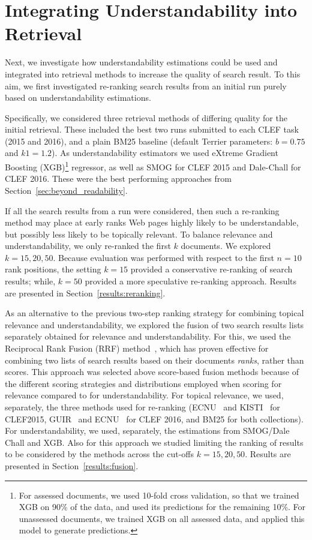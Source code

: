 \section{Integrating Understandability into Retrieval}
\label{sec:experiments}

Next, we investigate how understandability estimations could be used and integrated into retrieval methods to increase the quality of search result. To this aim, we first investigated re-ranking search results from an initial run purely based on understandability estimations. 

Specifically, we considered three retrieval methods of differing quality for the initial retrieval. These included the best two runs submitted to each CLEF task (2015 and 2016), and a plain BM25 baseline (default Terrier parameters: $b=0.75$ and $k1=1.2$). As understandability estimators we used  eXtreme Gradient Boosting (XGB)\footnote{For assessed documents, we used 10-fold cross validation, so that we trained XGB on 90\% of the data, and used its predictions for the remaining 10\%. For unassessed documents, we trained XGB on all assessed data, and applied this model to generate predictions.} regressor, as well as SMOG for CLEF 2015 and Dale-Chall for CLEF 2016. These were the best performing approaches from Section~\ref{sec:beyond_readability}.

If all the search results from a run were considered, then such a re-ranking method may place at early ranks Web pages highly likely to be understandable, but possibly less likely to be topically relevant. To balance relevance and understandability, we only re-ranked the first $k$ documents. We explored $k = 15, 20, 50$. Because evaluation was performed with respect to the first $n=10$ rank positions, the setting $k=15$ provided a conservative re-ranking of search results; while, $k=50$ provided a more speculative re-ranking approach. Results are presented in Section~\ref{results:reranking}.

As an alternative to the previous two-step ranking strategy for combining topical relevance and understandability, we explored the fusion of two search results lists separately obtained for relevance and understandability. For this, we used the Reciprocal Rank Fusion (RRF) method~\cite{cormack09}, which has proven effective for combining two lists of search results based on their documents \textit{ranks}, rather than scores. This approach was selected above score-based fusion methods because of the different scoring strategies and distributions employed when scoring for relevance compared to for understandability. For topical relevance, we used, separately, the three methods used for re-ranking (ECNU~\cite{song15} and KISTI~\cite{oh15} for CLEF2015, GUIR~\cite{soldaini16} and ECNU~\cite{song16} for CLEF 2016, and BM25 for both collections). For understandability, we used, separately, the estimations from SMOG/Dale Chall and XGB. Also for this approach we studied limiting the ranking of results to be considered by the methods across the cut-offs $k=15, 20, 50$. Results are presented in Section~\ref{results:fusion}.

